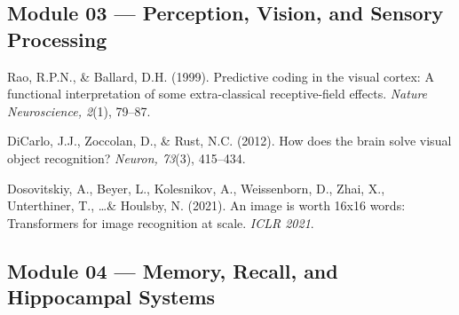 \documentclass[12pt, a4paper]{article}
\begin{document}
\subsection*{Module 03 — Perception, Vision, and Sensory Processing}

\begin{enumerate}[leftmargin=0.4in, label={[\arabic*]}, resume]

\item Rao, R.P.N., \& Ballard, D.H. (1999). Predictive coding in the visual cortex: A functional interpretation of some extra-classical receptive-field effects. \textit{Nature Neuroscience, 2}(1), 79--87.

\item DiCarlo, J.J., Zoccolan, D., \& Rust, N.C. (2012). How does the brain solve visual object recognition? \textit{Neuron, 73}(3), 415--434.

\item Dosovitskiy, A., Beyer, L., Kolesnikov, A., Weissenborn, D., Zhai, X., Unterthiner, T., \ldots \& Houlsby, N. (2021). An image is worth 16x16 words: Transformers for image recognition at scale. \textit{ICLR 2021}.

\end{enumerate}

\subsection*{Module 04 — Memory, Recall, and Hippocampal Systems}
\end{document}

